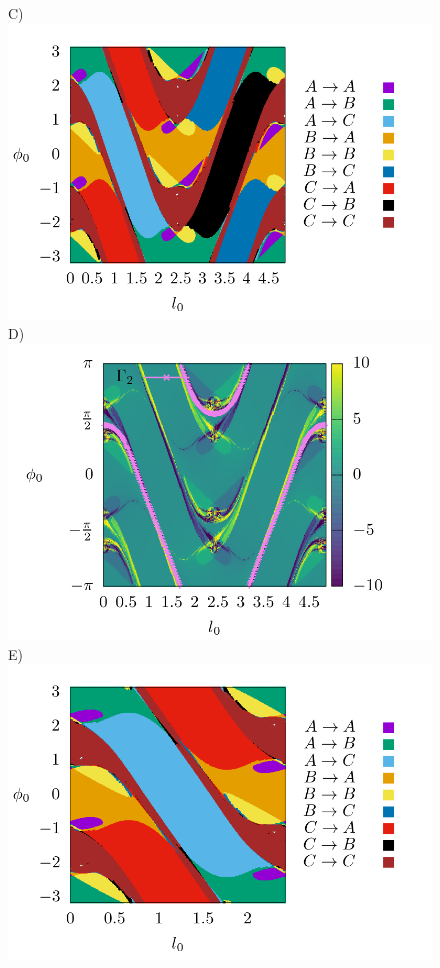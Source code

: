\documentclass[10pt,aps,onecolumn,superscriptaddress]{revtex4-2}
\begin{document}
\begin{figure}[htbp]
	C)\includegraphics[scale=0.35]{fate_map_ds_gamma2E_001.png}
	D)\includegraphics[scale=0.35]{ld_action_ds_gamma2_E_001.png}
	E)\includegraphics[scale=0.35]{fate_map_ds_gamma3E_001.png}

\end{figure}
\end{document}
